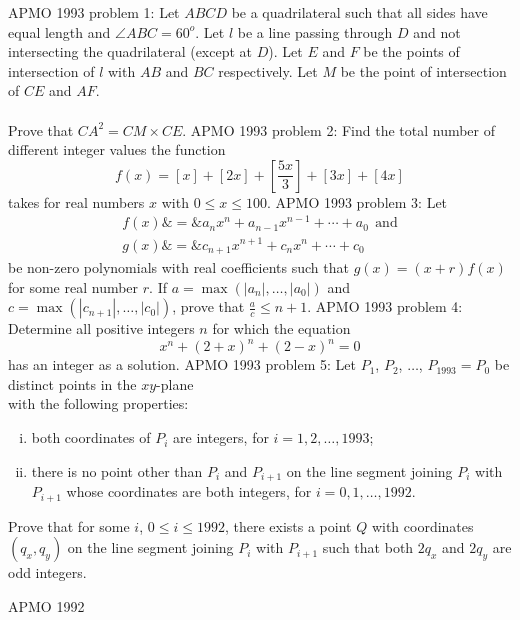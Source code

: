 APMO 1993 problem 1:  Let $ABCD$ be a quadrilateral such that all sides have equal length and $\angle{ABC} =60^o$.  Let $l$ be a line passing through $D$ and not intersecting the quadrilateral (except at $D$).  Let $E$ and $F$ be the points of intersection of $l$ with $AB$ and $BC$ respectively.  Let $M$ be the point of intersection of $CE$ and $AF$. \\\\
Prove that $CA^2 = CM \times CE$. 
APMO 1993 problem 2:  Find the total number of different integer values the function
\[ f(x) = [x] + [2x] + [\frac{5x}{3}] + [3x] + [4x] \]
takes for real numbers $x$ with $0 \leq x \leq 100$. 
APMO 1993 problem 3:  Let
\begin{eqnarray*} f(x) \& = \& a_n x^n + a_{n-1} x^{n-1} + \cdots + a_0 \ \ \mbox{and} \\ g(x) \& = \& c_{n+1} x^{n+1} + c_n x^n + \cdots + c_0 \end{eqnarray*}
be non-zero polynomials with real coefficients such that $g(x) = (x+r)f(x)$ for some real number $r$.  If $a = \max(|a_n|, \ldots, |a_0|)$ and $c = \max(|c_{n+1}|, \ldots, |c_0|)$, prove that $\frac{a}{c} \leq n+1$. 
APMO 1993 problem 4:  Determine all positive integers $n$ for which the equation
\[ x^n + (2+x)^n + (2-x)^n = 0 \]
has an integer as a solution. 
APMO 1993 problem 5:  Let $P_1$, $P_2$, $\ldots$, $P_{1993} = P_0$ be distinct points in the $xy$-plane \\
with the following properties:
\begin{enumerate}[(i)]
  \item both coordinates of $P_i$ are integers, for $i = 1, 2, \ldots, 1993$;
  \item there is no point other than $P_i$ and $P_{i+1}$ on the line segment joining $P_i$ with $P_{i+1}$ whose coordinates are both integers, for $i = 0, 1, \ldots, 1992$.
\end{enumerate}
Prove that for some $i$, $0 \leq i \leq 1992$, there exists a point $Q$ with coordinates $(q_x, q_y)$ on the line segment joining $P_i$ with $P_{i+1}$ such that both $2q_x$ and $2q_y$ are odd integers. 

APMO 1992 

